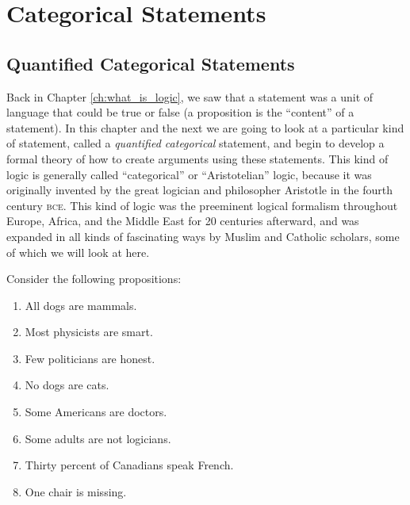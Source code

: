 \chapter{Categorical Statements}
\label{ch:catstatements}


\section{Quantified Categorical Statements}
\label{sec:qcatstatements}

Back in Chapter \ref{ch:what_is_logic}, we saw that a statement was a unit of language that could be true or false (a proposition is the ``content'' of a statement). In this chapter and the next we are going to look at a particular kind of statement, called a \emph{quantified categorical} statement, and begin to develop a formal theory of how to create arguments using these statements. This kind of logic is generally called ``categorical'' or ``Aristotelian'' logic, because it was originally invented by the great logician and philosopher Aristotle in the fourth century \textsc{bce}. This kind of logic was the preeminent logical formalism throughout Europe, Africa, and the Middle East for 20 centuries afterward, and was expanded in all kinds of fascinating ways by Muslim and Catholic scholars, some of which we will look at here.

Consider the following propositions:

\begin{enumerate}[label=(\alph*)]
    \item \label{itm:dogs} All dogs are mammals.
    \item \label{itm:physicists} Most physicists are smart.
    \item \label{itm:politicians} Few politicians are honest.
    \item \label{itm:no_dogs} No dogs are cats.
    \item \label{itm:americans} Some Americans are doctors.
    \item \label{itm:adults}Some adults are not logicians.
    \item \label{itm:canadians} Thirty percent of Canadians speak French.
    \item \label{itm:chair} One chair is missing.
\end{enumerate}



